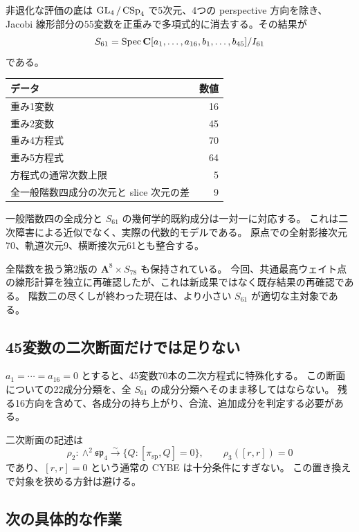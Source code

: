 \documentclass[11pt,a4paper]{ltjsarticle}
\theoremstyle{remark}\newtheorem{remark}[proposition]{注意}
\begin{document}
非退化な評価の底は $\operatorname{GL}_4/\operatorname{CSp}_4$ で5次元、4つの perspective 方向を除き、
Jacobi 線形部分の55変数を正重みで多項式的に消去する。その結果が
\[
 S_{61}=\operatorname{Spec}\mathbf C[a_1,\dots,a_{16},b_1,\dots,b_{45}]/I_{61}
\]
である。
\begin{center}
\begin{tabular}{@{}lr@{}}\toprule
データ & 数値\\\midrule
重み1変数 &16\\
重み2変数 &45\\
重み4方程式 &70\\
重み5方程式 &64\\
方程式の通常次数上限 &5\\
全一般階数四成分の次元と slice 次元の差 &9\\\bottomrule
\end{tabular}
\end{center}
一般階数四の全成分と $S_{61}$ の幾何学的既約成分は一対一に対応する。
これは二次障害による近似でなく、実際の代数的モデルである。
原点での全射影接次元70、軌道次元9、横断接次元61とも整合する。

全階数を扱う第2版の $\mathbf A^8\times S_{78}$ も保持されている。
今回、共通最高ウェイト点の線形計算を独立に再確認したが、これは新成果ではなく既存結果の再確認である。
階数二の尽くしが終わった現在は、より小さい $S_{61}$ が適切な主対象である。

\subsection{45変数の二次断面だけでは足りない}

$a_1=\cdots=a_{16}=0$ とすると、45変数70本の二次方程式に特殊化する。
この断面についての22成分分類を、全 $S_{61}$ の成分分類へそのまま移してはならない。
残る16方向を含めて、各成分の持ち上がり、合流、追加成分を判定する必要がある。

二次断面の記述は
\[
 \rho_2:\wedge^2\mathfrak{sp}_4\xrightarrow{\sim}
 \{Q:[\pi_{\mathrm{sp}},Q]=0\},\qquad
 \rho_3([r,r])=0
\]
であり、$[r,r]=0$ という通常の CYBE は十分条件にすぎない。
この置き換えで対象を狭める方針は避ける。

\subsection{次の具体的な作業}
\end{document}
